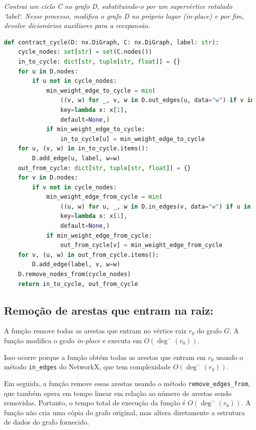 \begin{tcolorbox}[
        enhanced, breakable,
        colframe=blue!60!black, colback=blue!2,
        colbacktitle=blue!15, coltitle=black,
        title={Contração de ciclo},
        boxed title style={sharp corners, boxrule=0.6pt},
        sharp corners, boxrule=0.6pt
    ]
    \emph{Contrai um ciclo C no grafo D, substituindo-o por um supervértice rotulado `label`. Nesse processo, modifica o grafo D no próprio lugar (in-place) e por fim, devolve dicionários auxiliares para a reexpansão.}
    \tcblower
    \begin{lstlisting}[mathescape=true, language=Python]
def contract_cycle(D: nx.DiGraph, C: nx.DiGraph, label: str):
    cycle_nodes: set[str] = set(C.nodes())
    in_to_cycle: dict[str, tuple[str, float]] = {}
    for u in D.nodes:
        if u not in cycle_nodes:
            min_weight_edge_to_cycle = min(
                ((v, w) for _, v, w in D.out_edges(u, data="w") if v in cycle_nodes),
                key=lambda x: x[1],
                default=None,)
            if min_weight_edge_to_cycle:
                in_to_cycle[u] = min_weight_edge_to_cycle
    for u, (v, w) in in_to_cycle.items():
        D.add_edge(u, label, w=w)
    out_from_cycle: dict[str, tuple[str, float]] = {}
    for v in D.nodes:
        if v not in cycle_nodes:
            min_weight_edge_from_cycle = min(
                ((u, w) for u, _, w in D.in_edges(v, data="w") if u in cycle_nodes),
                key=lambda x: x[1],
                default=None,)
            if min_weight_edge_from_cycle:
                out_from_cycle[v] = min_weight_edge_from_cycle
    for v, (u, w) in out_from_cycle.items():
        D.add_edge(label, v, w=w)
    D.remove_nodes_from(cycle_nodes)
    return in_to_cycle, out_from_cycle  
\end{lstlisting}
\end{tcolorbox}


\subsection{Remoção de arestas que entram na raiz:}
A função remove todas as arestas que entram no vértice raiz \(r_0\) do grafo \(G\). A função modifica o grafo \emph{in-place} e executa em \(O(\deg^-(r_0))\).

Isso ocorre porque a função obtém todas as arestas que entram em \(r_0\) usando o método \texttt{in\_edges} do NetworkX, que tem complexidade \(O(\deg^-(r_0))\).

Em seguida, a função remove essas arestas usando o método \texttt{remove\_edges\_from}, que também opera em tempo linear em relação ao número de arestas sendo removidas. Portanto, o tempo total de execução da função é \(O(\deg^-(r_0))\). A função não cria uma cópia do grafo original, mas altera diretamente a estrutura de dados do grafo fornecido.

